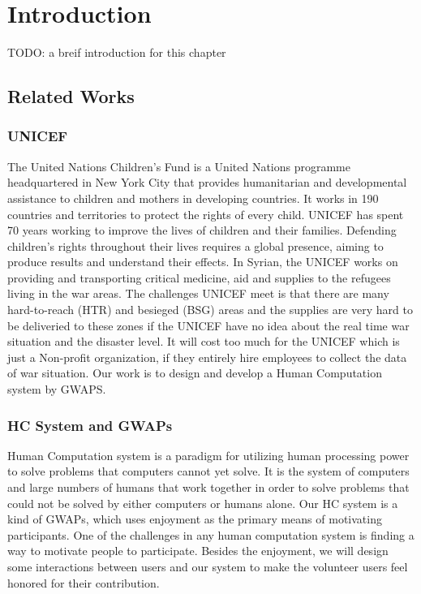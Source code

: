 \section{Introduction}

TODO: a breif introduction for this chapter

\subsection{Related Works}

\subsubsection{UNICEF}
The United Nations Children's Fund\cite{unicef1994state} is a United Nations programme headquartered
in New York City that provides humanitarian and developmental assistance to 
children and mothers in developing countries. 
It works in 190 countries and territories to protect the rights of every child. 
UNICEF has spent 70 years working to improve the lives of children and their families. 
Defending children's rights throughout their lives requires a global presence, 
aiming to produce results and understand their effects. 
In Syrian, the UNICEF works on providing and transporting critical medicine, 
aid and supplies to the refugees living in the war areas. The challenges UNICEF meet is that 
there are many hard-to-reach (HTR) and besieged (BSG) areas and the supplies are 
very hard to be deliveried to these zones if the UNICEF have no idea about 
the real time war situation and the disaster level. It will cost too much for the UNICEF 
which is just a Non-profit organization, if they entirely hire employees to 
collect the data of war situation. 
Our work is to design and develop a Human Computation system by GWAPS\cite{lafourcade2015games}.

\subsubsection{HC System and GWAPs}
Human Computation system is a paradigm for utilizing human processing power to solve problems that 
computers cannot yet solve\cite{quinn2011human}. 
It is the system of computers and large numbers of humans that work together in order to solve problems that 
could not be solved by either computers or humans alone\cite{quinn2009taxonomy}.
Our HC system is a kind of GWAPs, which uses enjoyment as the primary means of motivating participants. 
One of the challenges in any human computation system is finding a way to motivate people 
to participate\cite{quinn2011human}. 
Besides the enjoyment, we will design some interactions between users and our system to 
make the volunteer users feel honored for their contribution.

